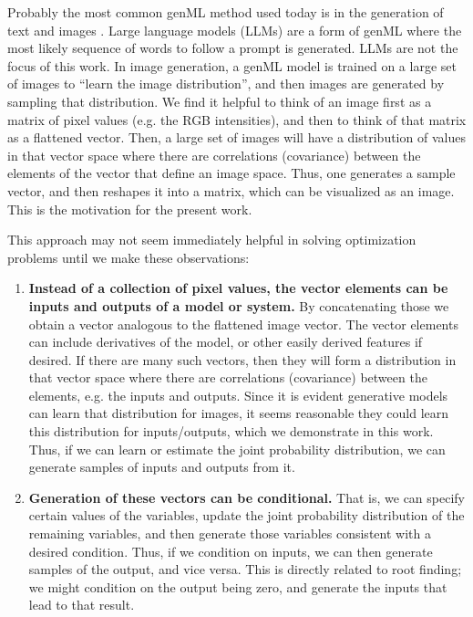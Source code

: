 \documentclass{achemso}
\begin{document}
Probably the most common genML method used today is in the generation of text \cite{becker-2024-text-gener} and images \cite{elasri-2022-image-gener}. Large language models (LLMs) are a form of genML where the most likely sequence of words to follow a prompt is generated. LLMs are not the focus of this work. In image generation, a genML model is trained on a large set of images to ``learn the image distribution'', and then images are generated by sampling that distribution. We find it helpful to think of an image first as a matrix of pixel values (e.g. the RGB intensities), and then to think of that matrix as a flattened vector. Then, a large set of images will have a distribution of values in that vector space where there are correlations (covariance) between the elements of the vector that define an image space. Thus, one generates a sample vector, and then reshapes it into a matrix, which can be visualized as an image.  This is the motivation for the present work.

This approach may not seem immediately helpful in solving optimization problems until we make these observations:


\begin{enumerate}
  \item \textbf{Instead of a collection of pixel values, the vector elements can be inputs and outputs of a model or system.} By concatenating those we obtain a vector analogous to the flattened image vector. The vector elements can  include derivatives of the model, or other easily derived features if desired. If there are many such vectors, then they will form a distribution in that vector space where there are correlations (covariance) between the elements, e.g. the inputs and outputs. Since it is evident generative models can learn that distribution for images, it seems reasonable they could learn this distribution for inputs/outputs, which we demonstrate in this work. Thus, if we can learn or estimate the joint probability distribution, we can generate samples of inputs and outputs from it. 
  \item \textbf{Generation of these vectors can be conditional.} That is, we can specify certain values of the variables, update the joint probability distribution of the remaining variables, and then generate those variables consistent with a desired condition. Thus, if we condition on inputs, we can then generate samples of the output, and vice versa. This is directly related to root finding; we might condition on the output being zero, and generate the inputs that lead to that result.
\end{enumerate}
\end{document}
